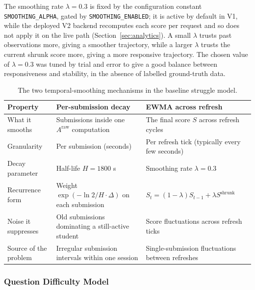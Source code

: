 The smoothing rate $\lambda = 0.3$ is fixed by the configuration constant \texttt{SMOOTHING\_ALPHA}, gated by \texttt{SMOOTHING\_ENABLED}; it is active by default in V1, while the deployed V2 backend recomputes each score per request and so does not apply it on the live path (Section~\ref{sec:analytics}). 
A small $\lambda$ trusts past observations more, giving a smoother trajectory, while a larger $\lambda$ trusts the current shrunk score more, giving a more responsive trajectory. 
The chosen value of $\lambda = 0.3$ was tuned by trial and error to give a good balance between responsiveness and stability, in the absence of labelled ground-truth data. 

\begin{table}[H]
    \centering
    \begin{tabular}{|p{}|p{}|p{}|}
    \hline
    \textbf{Property} & \textbf{Per-submission decay} & \textbf{EWMA across refresh} \\
    \hline
    What it smooths & Submissions inside one $A^{\mathrm{raw}}$ computation & The final score $S$ across refresh cycles \\
    \hline
    Granularity & Per submission (seconds) & Per refresh tick (typically every few seconds) \\
    \hline
    Decay parameter & Half-life $H = 1800$ s & Smoothing rate $\lambda = 0.3$ \\
    \hline
    Recurrence form & Weight $\exp(-\ln 2 / H \cdot \Delta)$ on each submission & $S_t = (1-\lambda)S_{t-1} + \lambda S^{\mathrm{shrunk}}$ \\
    \hline
    Noise it suppresses & Old submissions dominating a still-active student & Score fluctuations across refresh ticks \\
    \hline
    Source of the problem & Irregular submission intervals within one session & Single-submission fluctuations between refreshes \\
    \hline
    \end{tabular}
    \caption{The two temporal-smoothing mechanisms in the baseline struggle model.}
    \label{tab: temporal smoothing}
\end{table}

\subsubsection{Question Difficulty Model} \label{sec: task difficulty}

